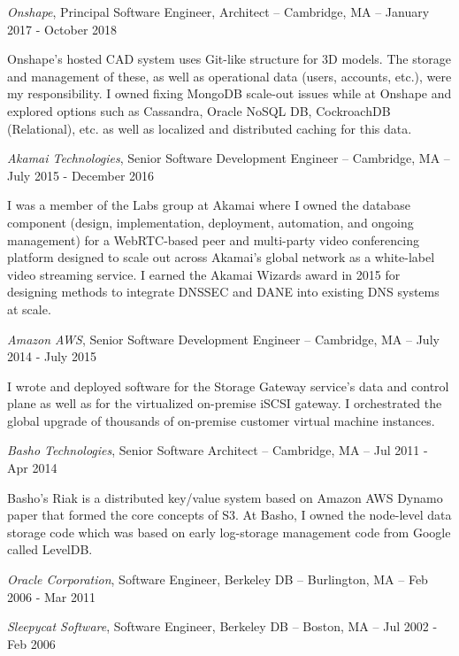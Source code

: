 \documentclass[letterpaper]{article}
\renewenvironment{itemize}{
  \begin{list}{}{
    \setlength{\leftmargin}{1.5em}
  }
}{
  \end{list}
}
\begin{document}
\begin{itemize}
\item {\it Onshape}, Principal Software Engineer, Architect -- Cambridge, MA -- January 2017 - October 2018

Onshape's hosted CAD system uses Git-like structure for 3D models. The storage and management of these, as well as operational data (users, accounts, etc.), were my responsibility. I owned fixing MongoDB scale-out issues while at Onshape and explored options such as Cassandra, Oracle NoSQL DB, CockroachDB (Relational), etc. as well as localized and distributed caching for this data.

\item {\it Akamai Technologies}, Senior Software Development Engineer -- Cambridge, MA -- July 2015 - December 2016

I was a member of the Labs group at Akamai where I owned the database component (design, implementation, deployment, automation, and ongoing management) for a WebRTC-based peer and multi-party video conferencing platform designed to scale out across Akamai's global network as a white-label video streaming service.  I earned the Akamai Wizards award in 2015 for designing methods to integrate DNSSEC and DANE into existing DNS systems at scale.

\item {\it Amazon AWS}, Senior Software Development Engineer -- Cambridge, MA -- July 2014 - July 2015

I wrote and deployed software for the Storage Gateway service's data and control plane as well as for the virtualized on-premise iSCSI gateway. I orchestrated the global upgrade of thousands of on-premise customer virtual machine instances.

\item {\it Basho Technologies}, Senior Software Architect -- Cambridge, MA -- Jul 2011 - Apr 2014

Basho's Riak is a distributed key/value system based on Amazon AWS Dynamo paper that formed the core concepts of S3.  At Basho, I owned the node-level data storage code which was based on early log-storage management code from Google called LevelDB.

\item {\it Oracle Corporation}, Software Engineer, Berkeley DB -- Burlington, MA -- Feb 2006 - Mar 2011

\item {\it Sleepycat Software}, Software Engineer, Berkeley DB -- Boston, MA -- Jul 2002 - Feb 2006


\end{itemize}
\end{document}
